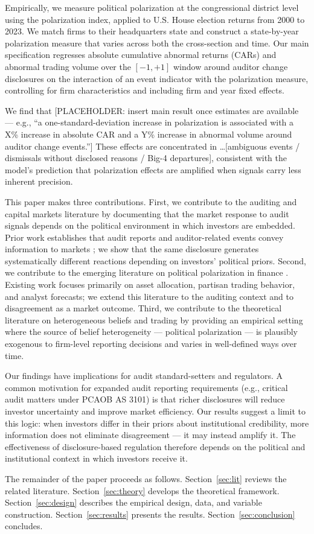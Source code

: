 Empirically, we measure political polarization at the congressional district level
using the \citet{esteban1994} polarization index, applied to U.S. House election
returns from 2000 to 2023. We match firms to their headquarters state and construct
a state-by-year polarization measure that varies across both the cross-section and
time. Our main specification regresses absolute cumulative abnormal returns (CARs)
and abnormal trading volume over the $[-1, +1]$ window around auditor change
disclosures on the interaction of an event indicator with the polarization measure,
controlling for firm characteristics and including firm and year fixed effects.

We find that [PLACEHOLDER: insert main result once estimates are available ---
e.g., ``a one-standard-deviation increase in polarization is associated with
a X\% increase in absolute CAR and a Y\% increase in abnormal volume around
auditor change events.''] These effects are concentrated in \ldots [ambiguous
events / dismissals without disclosed reasons / Big-4 departures], consistent
with the model's prediction that polarization effects are amplified when signals
carry less inherent precision.

This paper makes three contributions. First, we contribute to the auditing and
capital markets literature by documenting that the market response to audit signals
depends on the political environment in which investors are embedded. Prior work
establishes that audit reports and auditor-related events convey information to
markets \citep{firth1978, dodd1984, defond2014}; we show that the same disclosure
generates systematically different reactions depending on investors' political
priors. Second, we contribute to the emerging literature on political polarization
in finance \citep{kempf2024}. Existing work focuses primarily on asset allocation,
partisan trading behavior, and analyst forecasts; we extend this literature to the
auditing context and to disagreement as a market outcome. Third, we contribute to
the theoretical literature on heterogeneous beliefs and trading
\citep{harris1993, kandel1995, hong2007} by providing an empirical setting where
the source of belief heterogeneity --- political polarization --- is plausibly
exogenous to firm-level reporting decisions and varies in well-defined ways over
time.

Our findings have implications for audit standard-setters and regulators. A
common motivation for expanded audit reporting requirements (e.g., critical audit
matters under PCAOB AS 3101) is that richer disclosures will reduce investor
uncertainty and improve market efficiency. Our results suggest a limit to this
logic: when investors differ in their priors about institutional credibility, more
information does not eliminate disagreement --- it may instead amplify it. The
effectiveness of disclosure-based regulation therefore depends on the political
and institutional context in which investors receive it.

The remainder of the paper proceeds as follows. Section~\ref{sec:lit} reviews
the related literature. Section~\ref{sec:theory} develops the theoretical
framework. Section~\ref{sec:design} describes the empirical design, data, and
variable construction. Section~\ref{sec:results} presents the results.
Section~\ref{sec:conclusion} concludes.
